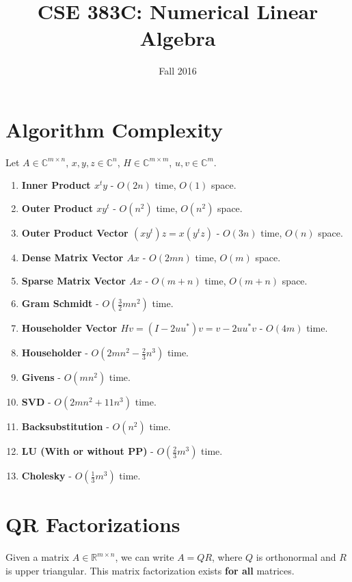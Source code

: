 \documentclass{article}
\title{CSE 383C: Numerical Linear Algebra}
\date{Fall 2016}
\theoremstyle{definition}
\begin{document}
\maketitle

\section{Algorithm Complexity}

Let $A \in \mathbb{C}^{m \times n}$, $x, y, z \in \mathbb{C}^n$, $H \in \mathbb{C}^{m \times m}$, $u, v \in \mathbb{C}^{m}$.

\begin{enumerate}[label=\textbf{\roman*.}]
    \item \textbf{Inner Product $x^t y$} - $O(2n)$ time, $O(1)$ space.
    \item \textbf{Outer Product $x y^t$} - $O(n^2)$ time, $O(n^2)$ space.
    \item \textbf{Outer Product Vector $(x y^t) z = x (y^t z)$} - $O(3n)$ time, $O(n)$ space.
    \item \textbf{Dense Matrix Vector $Ax$} - $O(2mn)$ time, $O(m)$ space.
    \item \textbf{Sparse Matrix Vector $Ax$} - $O(m + n)$ time, $O(m + n)$ space.
    \item \textbf{Gram Schmidt} - $O(\frac{3}{2}mn^2)$ time.
    \item \textbf{Householder Vector $Hv = (I - 2 u u^*) v = v - 2 u u^* v$} - $O(4m)$ time.
    \item \textbf{Householder} - $O(2mn^2-\frac{2}{3}n^3)$ time.
    \item \textbf{Givens} - $O(mn^2)$ time.
    \item \textbf{SVD} - $O(2mn^2 + 11n^3)$ time.
    \item \textbf{Backsubstitution} - $O(n^2)$ time.
    \item \textbf{LU (With or without PP)} - $O(\frac{2}{3}m^3)$ time.
    \item \textbf{Cholesky} - $O(\frac{1}{3}m^3)$ time.
\end{enumerate}

\pagebreak

\section{QR Factorizations}
Given a matrix $A \in \mathbb{R}^{m \times n}$, we can write $A = QR$, where $Q$ is orthonormal and $R$ is upper triangular. This matrix factorization exists \textbf{for all} matrices.
\end{document}
